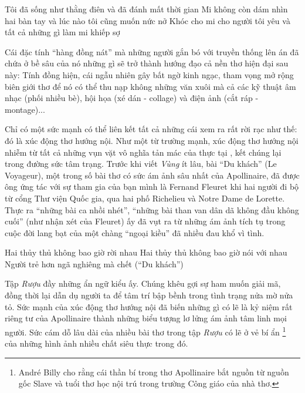 \documentclass[../main.tex]{subfiles}
\begin{document}
\begin{multicols}{2}
\begin{blockquote}
Tôi đã sống như thằng điên và đã đánh mất thời gian        
Mi không còn dám nhìn hai bàn tay và lúc nào tôi cũng muốn nức nở        
Khóc cho mi cho người tôi yêu và tất cả những gì làm mi khiếp sợ 

\end{blockquote}
 
Cái đặc tính “hàng đồng nát” mà những người gắn bó với truyền thống lên án đã chứa ở bề sâu của nó những gì sẽ trở thành hướng đạo cả nền thơ hiện đại sau này: Tính đồng hiện, cái ngẫu nhiên gây bất ngờ kinh ngạc, tham vọng mở rộng biên giới thơ để nó có thể thu nạp không những văn xuôi mà cả các kỹ thuật âm nhạc (phối nhiều bè), hội họa (xé dán - collage) và điện ảnh (cắt ráp - montage)... 
 
Chỉ có một sức mạnh có thể liên kết tất cả những cái xem ra rất rời rạc như thế: đó là xúc động thơ hướng nội. Như một từ trường mạnh, xúc động thơ hướng nội nhiễm từ tất cả những vụn vặt vô nghĩa tản mác của thực tại , kết chúng lại trong đường sức tâm trạng. Trước khi viết \textit{Vùng} ít lâu, bài “Du khách” (Le Voyageur), một trong số bài thơ có sức ám ảnh sâu nhất của Apollinaire, đã được ông ứng tác với sự tham gia của bạn mình là Fernand Fleuret khi hai người đi bộ từ cổng Thư viện Quốc gia, qua hai phố Richelieu và Notre Dame de Lorette. Thực ra “những bài ca nhồi nhét”, “những bài than van dân dã không đầu không cuối” (như nhận xét của Fleuret) ấy đã vụt ra từ những ám ảnh tích tụ trong cuộc đời lang bạt của một chàng “ngoại kiều” đã nhiều đau khổ vì tình. 
\begin{blockquote}
        
Hai thủy thủ không bao giờ rời nhau        
Hai thủy thủ không bao giờ nói với nhau        
Người trẻ hơn ngã nghiêng mà chết 
	(“Du khách”) 

\end{blockquote}
 
Tập \textit{Rượu} đầy những ẩn ngữ kiểu ấy. Chúng khêu gợi sự ham muốn giải mã, đồng thời lại dẫn dụ người ta để tâm trí bập bềnh trong tình trạng nửa mờ nửa tỏ. Sức mạnh của xúc động thơ hướng nội đã biến những gì có lẽ là kỷ niệm rất riêng tư của Apollinaire thành những biểu tượng lơ lửng ám ảnh tâm linh mọi người. Sức cám dỗ lâu dài của nhiều bài thơ trong tập \textit{Rượu} có lẽ ở vẻ bí ẩn \footnote{
André Billy cho rằng cái thần bí trong thơ Apollinaire bắt nguồn từ nguồn gốc Slave và tuổi thơ học nội trú trong trường Công giáo của nhà thơ.}  của những hình ảnh nhiều chất siêu thực trong đó. 
 

\end{multicols}
\end{document}
